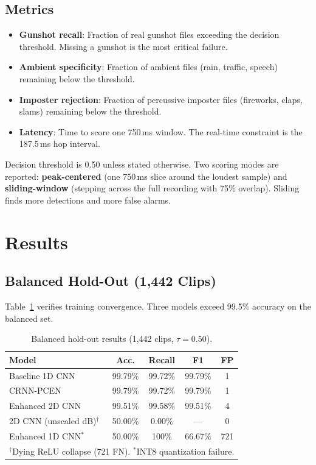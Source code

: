 \documentclass[conference]{IEEEtran}
\begin{document}
\subsection{Metrics}
\begin{itemize}
    \item \textbf{Gunshot recall}: Fraction of real gunshot files exceeding the decision threshold. Missing a gunshot is the most critical failure.
    \item \textbf{Ambient specificity}: Fraction of ambient files (rain, traffic, speech) remaining below the threshold.
    \item \textbf{Imposter rejection}: Fraction of percussive imposter files (fireworks, claps, slams) remaining below the threshold.
    \item \textbf{Latency}: Time to score one 750\,ms window. The real-time constraint is the 187.5\,ms hop interval.
\end{itemize}
Decision threshold is 0.50 unless stated otherwise. Two scoring modes are reported: \textbf{peak-centered} (one 750\,ms slice around the loudest sample) and \textbf{sliding-window} (stepping across the full recording with 75\% overlap). Sliding finds more detections and more false alarms.

\section{Results}
\label{sec:results}

\subsection{Balanced Hold-Out (1{,}442 Clips)}
Table~\ref{tab:holdout} verifies training convergence. Three models exceed 99.5\% accuracy on the balanced set.

\begin{table}[!t]
\centering
\caption{Balanced hold-out results (1{,}442 clips, $\tau = 0.50$).}
\label{tab:holdout}
\footnotesize
\begin{tabular}{lcccc}
\toprule
\textbf{Model} & \textbf{Acc.} & \textbf{Recall} & \textbf{F1} & \textbf{FP} \\
\midrule
Baseline 1D CNN & 99.79\% & 99.72\% & 99.79\% & 1 \\
CRNN-PCEN & 99.79\% & 99.72\% & 99.79\% & 1 \\
Enhanced 2D CNN & 99.51\% & 99.58\% & 99.51\% & 4 \\
2D CNN (unscaled dB)$^\dagger$ & 50.00\% & 0.00\% & --- & 0 \\
Enhanced 1D CNN$^*$ & 50.00\% & 100\% & 66.67\% & 721 \\
\bottomrule
\multicolumn{5}{l}{\footnotesize $^\dagger$Dying ReLU collapse (721 FN). $^*$INT8 quantization failure.}
\end{tabular}
\end{table}
\end{document}

